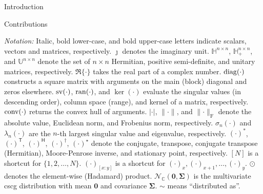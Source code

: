 \documentclass[journal]{IEEEtran}
\begin{document}
\begin{section}{Introduction}
\begin{subsection}{Contributions}
	\end{subsection}

	\emph{Notation:}
	Italic, bold lower-case, and bold upper-case letters indicate scalars, vectors and matrices, respectively.
	$\jmath$ denotes the imaginary unit.
	$\mathbb{H}^{n \times n}$, $\mathbb{H}_+^{n \times n}$, and $\mathbb{U}^{n \times n}$ denote the set of $n \times n$ Hermitian, positive semi-definite, and unitary matrices, respectively.
	$\Re\{\cdot\}$ takes the real part of a complex number.
	$\operatorname{diag}(\cdot)$ constructs a square matrix with arguments on the main (block) diagonal and zeros elsewhere.
	$\operatorname{sv}(\cdot)$, $\operatorname{ran}(\cdot)$, and $\ker(\cdot)$ evaluate the singular values (in descending order), column space (range), and kernel of a matrix, respectively.
	$\operatorname{conv}(\cdot)$ returns the convex hull of arguments.
	$\lvert \cdot \rvert$, $\lVert \cdot \rVert$, and $\lVert \cdot \rVert _\mathrm{F}$ denote the absolute value, Euclidean norm, and Frobenius norm, respectively.
	$\sigma_n(\cdot)$ and $\lambda_n(\cdot)$ are the $n$-th largest singular value and eigenvalue, respectively.
	$(\cdot)^*$, $(\cdot)^\mathsf{T}$, $(\cdot)^\mathsf{H}$, $(\cdot)^\dagger$, $(\cdot)^{\star}$ denote the conjugate, transpose, conjugate transpose (Hermitian), Moore-Penrose inverse, and stationary point, respectively.
	$[N]$ is a shortcut for $\{1,2,\ldots,N\}$.
	$(\cdot)_{[x:y]}$ is a shortcut for $(\cdot)_x,(\cdot)_{x+1},\ldots,(\cdot)_y$.
	$\odot$ denotes the element-wise (Hadamard) product.
	$\mathcal{N}_{\mathbb{C}}(\mathbf{0}, \mathbf{\Sigma})$ is the multivariate \gls{cscg} distribution with mean $\mathbf{0}$ and covariance $\mathbf{\Sigma}$.
	$\sim$ means ``distributed as''.
\end{section}
\end{document}
